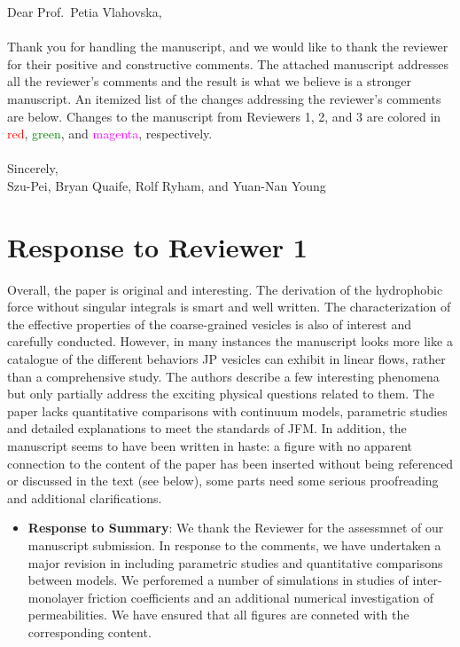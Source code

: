 \documentclass[11pt]{article}
\newcommand{\comment}[1]{{\color{blue} #1}}
\begin{document}
\noindent
Dear Prof.~Petia Vlahovska,
\\ \\
\noindent
Thank you for handling the manuscript, and we would like to thank the
reviewer for their positive and constructive comments. The attached
manuscript addresses all the reviewer's comments and the result is what
we believe is a stronger manuscript. An itemized list of the changes
addressing the reviewer's comments are below. Changes to the manuscript
from Reviewers 1, 2, and 3 are colored in \textcolor{red}{red},
\textcolor{green}{green}, and \textcolor{magenta}{magenta},
respectively. \\ \\
\noindent
Sincerely,
\\
\noindent
Szu-Pei, Bryan Quaife, Rolf Ryham, and Yuan-Nan Young

\section*{Response to Reviewer 1}
\noindent
\comment{Overall, the paper is original and interesting. The derivation
of the hydrophobic force without singular integrals is smart and well
written. The characterization of the effective properties of the
coarse-grained vesicles is also of interest and carefully conducted.
However, in many instances the manuscript looks more like a catalogue of
the different behaviors JP vesicles can exhibit in linear flows, rather
than a comprehensive study. The authors describe a few interesting
phenomena but only partially address the exciting physical questions
related to them. The paper lacks quantitative comparisons with continuum
models, parametric studies and detailed explanations to meet the
standards of JFM. In addition, the manuscript seems to have been written
in haste: a figure with no apparent connection to the content of the
paper has been inserted without being referenced or discussed in the
text (see below), some parts need some serious proofreading and
additional clarifications.}
\begin{itemize}
  \item {\bf Response to Summary}: 	We thank the Reviewer for the assessmnet of our manuscript submission. In response
to the comments, we have undertaken a major revision in including parametric studies and quantitative comparisons between models. We perforemed a number of simulations 
in studies of inter-monolayer friction coefficients and an additional numerical investigation 
of permeabilities. We have ensured that all figures are conneted with the corresponding content. 
  \begin{quotation}
  \end{quotation}
\end{itemize}
\end{document}
